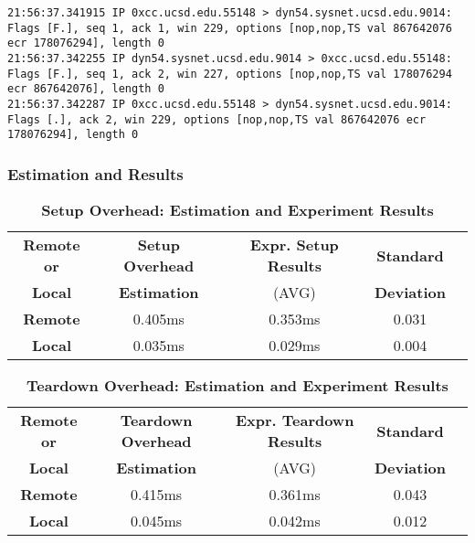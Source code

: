 \begin{lstlisting}
21:56:37.341915 IP 0xcc.ucsd.edu.55148 > dyn54.sysnet.ucsd.edu.9014: Flags [F.], seq 1, ack 1, win 229, options [nop,nop,TS val 867642076 ecr 178076294], length 0
21:56:37.342255 IP dyn54.sysnet.ucsd.edu.9014 > 0xcc.ucsd.edu.55148: Flags [F.], seq 1, ack 2, win 227, options [nop,nop,TS val 178076294 ecr 867642076], length 0
21:56:37.342287 IP 0xcc.ucsd.edu.55148 > dyn54.sysnet.ucsd.edu.9014: Flags [.], ack 2, win 229, options [nop,nop,TS val 867642076 ecr 178076294], length 0
\end{lstlisting}

\subsubsection{Estimation and Results}

\begin{table}[ht]
  \centering
  \caption{\textbf{Setup Overhead: Estimation and Experiment Results}}
  \begin{threeparttable}
  \begin{tabular}{ccccc}
  \hline
      \textbf{Remote or} & \textbf{Setup Overhead}  & \textbf{Expr. Setup Results} & \textbf{Standard} \\
      \textbf{Local}  & \textbf{Estimation}  & (AVG)   & \textbf{Deviation} \\
  \hline
      \textbf{Remote}  & 0.405ms & 0.353ms & 0.031 \\
      \textbf{Local} & 0.035ms & 0.029ms & 0.004 \\
  \hline
  \end{tabular}
  \end{threeparttable}
  \label{setup_overhead_table}
\end{table}

\begin{table}[ht]
  \centering
  \caption{\textbf{Teardown Overhead: Estimation and Experiment Results}}
  \begin{threeparttable}
  \begin{tabular}{ccccc}
  \hline
      \textbf{Remote or} & \textbf{Teardown Overhead}  & \textbf{Expr. Teardown Results} & \textbf{Standard} \\
      \textbf{Local}  & \textbf{Estimation}  & (AVG)   & \textbf{Deviation} \\
  \hline
      \textbf{Remote}  & 0.415ms & 0.361ms & 0.043 \\
      \textbf{Local} & 0.045ms & 0.042ms & 0.012 \\
  \hline
  \end{tabular}
  \end{threeparttable}
  \label{setup_table}
\end{table}

